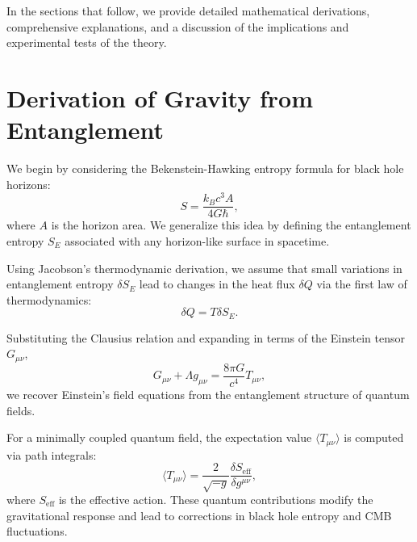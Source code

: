\documentclass[12pt, a4paper]{article}
\begin{document}
In the sections that follow, we provide detailed mathematical derivations, comprehensive explanations, and a discussion of the implications and experimental tests of the theory.


\section{Derivation of Gravity from Entanglement}
We begin by considering the Bekenstein-Hawking entropy formula for black hole horizons:
\begin{equation}
    S = \frac{k_B c^3 A}{4 G \hbar},
\end{equation}
where $A$ is the horizon area. We generalize this idea by defining the entanglement entropy $S_E$ associated with any horizon-like surface in spacetime.

Using Jacobson’s thermodynamic derivation, we assume that small variations in entanglement entropy $\delta S_E$ lead to changes in the heat flux $\delta Q$ via the first law of thermodynamics:
\begin{equation}
    \delta Q = T \delta S_E.
\end{equation}

Substituting the Clausius relation and expanding in terms of the Einstein tensor $G_{\mu\nu}$,
\begin{equation}
    G_{\mu\nu} + \Lambda g_{\mu\nu} = \frac{8 \pi G}{c^4} T_{\mu\nu},
\end{equation}
we recover Einstein’s field equations from the entanglement structure of quantum fields.


For a minimally coupled quantum field, the expectation value $\langle T_{\mu\nu} \rangle$ is computed via path integrals:
\begin{equation}
    \langle T_{\mu\nu} \rangle = \frac{2}{\sqrt{-g}} \frac{\delta S_{\text{eff}}}{\delta g^{\mu\nu}},
\end{equation}
where $S_{\text{eff}}$ is the effective action. These quantum contributions modify the gravitational response and lead to corrections in black hole entropy and CMB fluctuations.
\end{document}
